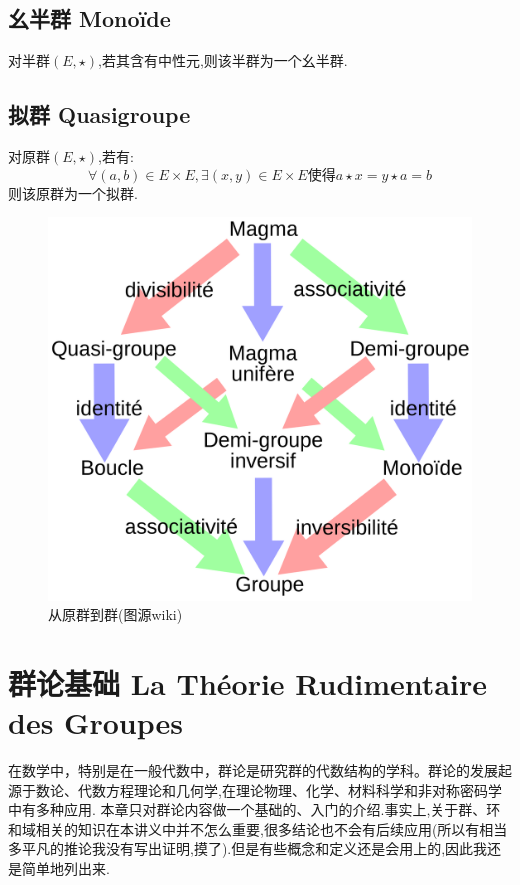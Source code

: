 \documentclass[12pt, a4paper, oneside]{ctexbook}
\begin{document}
  \subsection{幺半群 Monoïde}
  对半群$(E,\star)$,若其含有中性元,则该半群为一个幺半群.

  \subsection{拟群 Quasigroupe}
  对原群$(E,\star)$,若有:
  $$
  \forall (a,b)\in E\times E, \exists (x,y)\in E\times E\text{使得}a\star x=y\star a=b
  $$则该原群为一个拟群.


  \begin{figure}[H]
    \centering
    \includegraphics[scale=0.13]{magma_groupe.png}
    \caption{从原群到群(图源wiki)}
    \label{myref:群与原群}
  \end{figure}

  \section{群论基础 La Théorie Rudimentaire des Groupes}
  在数学中，特别是在一般代数中，群论是研究群的代数结构的学科。群论的发展起源于数论、代数方程理论和几何学,在理论物理、化学、材料科学和非对称密码学中有多种应用.
  本章只对群论内容做一个基础的、入门的介绍.事实上,关于群、环和域相关的知识在本讲义中并不怎么重要,很多结论也不会有后续应用(所以有相当多平凡的推论我没有写出证明,摸了).但是有些概念和定义还是会用上的,因此我还是简单地列出来.
\end{document}
